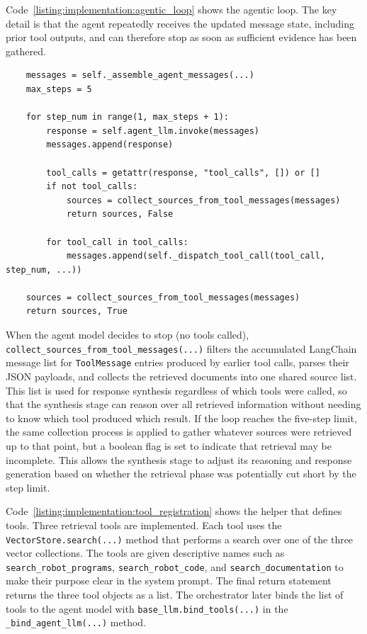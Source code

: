 Code~\ref{listing:implementation:agentic_loop} shows the agentic loop. The key detail is that the agent repeatedly receives the updated message state, including prior tool outputs, and can therefore stop as soon as sufficient evidence has been gathered.

\begin{listing}[H]
	\begin{verbatim}
	messages = self._assemble_agent_messages(...)
	max_steps = 5

	for step_num in range(1, max_steps + 1):
		response = self.agent_llm.invoke(messages)
		messages.append(response)

		tool_calls = getattr(response, "tool_calls", []) or []
		if not tool_calls:
			sources = collect_sources_from_tool_messages(messages)
			return sources, False

		for tool_call in tool_calls:
			messages.append(self._dispatch_tool_call(tool_call, step_num, ...))

	sources = collect_sources_from_tool_messages(messages)
	return sources, True
	\end{verbatim}
	\caption{Agentic orchestration loop.}
	\label{listing:implementation:agentic_loop}
\end{listing}

When the agent model decides to stop (no tools called), \texttt{collect\_sources\_from\_tool\_messages(...)} filters the accumulated LangChain message list for \texttt{ToolMessage} entries produced by earlier tool calls, parses their JSON payloads, and collects the retrieved documents into one shared source list. This list is used for response synthesis regardless of which tools were called, so that the synthesis stage can reason over all retrieved information without needing to know which tool produced which result. If the loop reaches the five-step limit, the same collection process is applied to gather whatever sources were retrieved up to that point, but a boolean flag is set to indicate that retrieval may be incomplete. This allows the synthesis stage to adjust its reasoning and response generation based on whether the retrieval phase was potentially cut short by the step limit.

Code~\ref{listing:implementation:tool_registration} shows the helper that defines tools. Three retrieval tools are implemented. Each tool uses the \texttt{VectorStore.search(...)} method that performs a search over one of the three vector collections. The tools are given descriptive names such as \texttt{search\_robot\_programs}, \texttt{search\_robot\_code}, and \texttt{search\_doc\-umentation} to make their purpose clear in the system prompt. The final return statement returns the three tool objects as a list. The orchestrator later binds the list of tools to the agent model with \texttt{base\_llm.bind\_tools(...)} in the \texttt{\_bind\_agent\_llm(...)} method.

